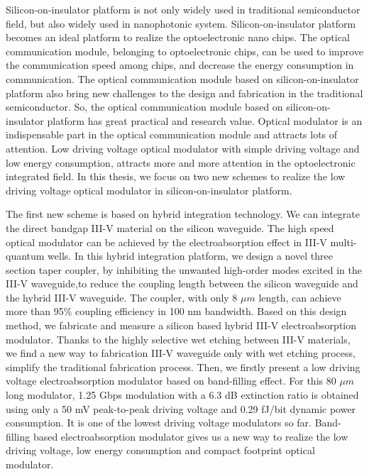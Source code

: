 \begin{englishabstract}
Silicon-on-insulator platform is not only widely used in traditional semiconductor field, but also widely used in nanophotonic system. Silicon-on-insulator platform becomes an ideal platform to realize the optoelectronic nano chips. The optical communication module, belonging to optoelectronic chips, can be used to improve the communication speed among chips, and decrease the energy consumption in communication. The optical communication module based on silicon-on-insulator platform also bring new challenges to the design and fabrication in the traditional semiconductor. So, the optical communication module based on silicon-on-insulator platform has great practical and research value. Optical modulator is an indispensable part in the optical communication module and attracts lots of attention. Low driving voltage optical modulator with simple driving voltage and low energy consumption, attracts more and more attention in the optoelectronic integrated field. In this thesis, we focus on two new schemes to realize the low driving voltage optical modulator in silicon-on-insulator platform.

The first new scheme is based on hybrid integration technology. We can integrate the direct bandgap III-V material on the silicon waveguide. The high speed optical modulator can be achieved by the electroabsorption effect in III-V multi-quantum wells. In this hybrid integration platform, we design a novel three section taper coupler, by inhibiting the unwanted high-order modes excited in the III-V waveguide,to reduce the coupling length between the silicon waveguide and the hybrid III-V waveguide. The coupler, with only 8 $\mu m$ length, can achieve more than 95\% coupling efficiency in 100 nm bandwidth. Based on this design method, we fabricate and measure a silicon based hybrid III-V electroabsorption modulator. Thanks to the highly selective wet etching between III-V materials, we find a new way to fabrication III-V waveguide only with wet etching process, simplify the traditional  fabrication process. Then, we firstly present a low driving voltage electroabsorption modulator based on band-filling effect. For this 80 $\mu m$ long modulator, 1.25 Gbps modulation with a 6.3 dB extinction ratio is obtained using only a 50 mV peak-to-peak driving voltage and 0.29 fJ/bit dynamic power consumption. It is one of the lowest driving voltage modulators so far. Band-filling based electroabsorption modulator gives us a new way to realize the low driving voltage, low energy consumption and compact footprint optical modulator.


\end{englishabstract}
